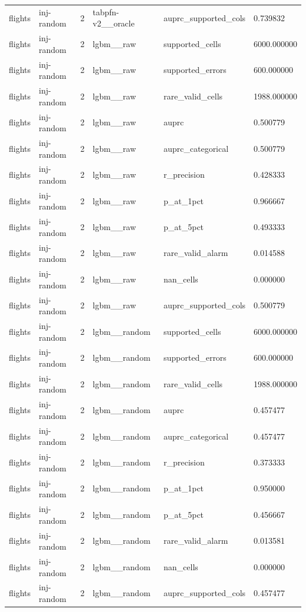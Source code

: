 \begin{tabular}{llllll}
flights & inj-random & 2 & tabpfn-v2\_\_oracle & auprc\_supported\_cols & 0.739832 \\
flights & inj-random & 2 & lgbm\_\_raw & supported\_cells & 6000.000000 \\
flights & inj-random & 2 & lgbm\_\_raw & supported\_errors & 600.000000 \\
flights & inj-random & 2 & lgbm\_\_raw & rare\_valid\_cells & 1988.000000 \\
flights & inj-random & 2 & lgbm\_\_raw & auprc & 0.500779 \\
flights & inj-random & 2 & lgbm\_\_raw & auprc\_categorical & 0.500779 \\
flights & inj-random & 2 & lgbm\_\_raw & r\_precision & 0.428333 \\
flights & inj-random & 2 & lgbm\_\_raw & p\_at\_1pct & 0.966667 \\
flights & inj-random & 2 & lgbm\_\_raw & p\_at\_5pct & 0.493333 \\
flights & inj-random & 2 & lgbm\_\_raw & rare\_valid\_alarm & 0.014588 \\
flights & inj-random & 2 & lgbm\_\_raw & nan\_cells & 0.000000 \\
flights & inj-random & 2 & lgbm\_\_raw & auprc\_supported\_cols & 0.500779 \\
flights & inj-random & 2 & lgbm\_\_random & supported\_cells & 6000.000000 \\
flights & inj-random & 2 & lgbm\_\_random & supported\_errors & 600.000000 \\
flights & inj-random & 2 & lgbm\_\_random & rare\_valid\_cells & 1988.000000 \\
flights & inj-random & 2 & lgbm\_\_random & auprc & 0.457477 \\
flights & inj-random & 2 & lgbm\_\_random & auprc\_categorical & 0.457477 \\
flights & inj-random & 2 & lgbm\_\_random & r\_precision & 0.373333 \\
flights & inj-random & 2 & lgbm\_\_random & p\_at\_1pct & 0.950000 \\
flights & inj-random & 2 & lgbm\_\_random & p\_at\_5pct & 0.456667 \\
flights & inj-random & 2 & lgbm\_\_random & rare\_valid\_alarm & 0.013581 \\
flights & inj-random & 2 & lgbm\_\_random & nan\_cells & 0.000000 \\
flights & inj-random & 2 & lgbm\_\_random & auprc\_supported\_cols & 0.457477 \\

\end{tabular}
